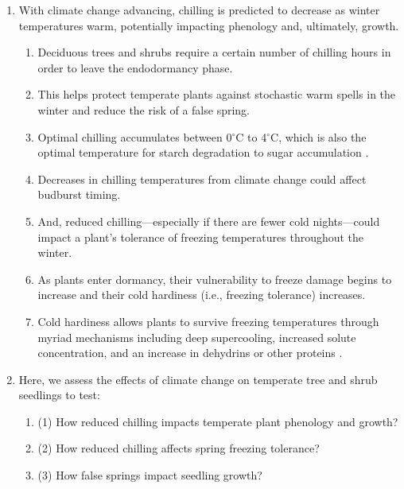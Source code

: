 \documentclass{article}\usepackage[]{graphicx}\usepackage[]{color}
\begin{document}
\begin{enumerate}
\item With climate change advancing, chilling is predicted to decrease as winter temperatures warm, potentially impacting phenology and, ultimately, growth.
  \begin{enumerate}
  \item Deciduous trees and shrubs require a certain number of chilling hours in order to leave the endodormancy phase. 
  \item This helps protect temperate plants against stochastic warm spells in the winter and reduce the risk of a false spring.
  \item Optimal chilling accumulates between 0$^{\circ}$C to 4$^{\circ}$C, which is also the optimal temperature for starch degradation to sugar accumulation \citep{Tixier2019}.
  \item Decreases in chilling temperatures from climate change could affect budburst timing.
  \item And, reduced chilling---especially if there are fewer cold nights---could impact a plant's tolerance of freezing temperatures throughout the winter.
  \item As plants enter dormancy, their vulnerability to freeze damage begins to increase and their cold hardiness (i.e., freezing tolerance) increases. 
  \item Cold hardiness allows plants to survive freezing temperatures through myriad mechanisms including deep supercooling, increased solute concentration, and an increase in dehydrins or other proteins \citep{Sakai1987, Strimbeck2015}.
  \end{enumerate}
  

\item Here, we assess the effects of climate change on temperate tree and shrub seedlings to test:  
  \begin{enumerate}
  \item (1) How reduced chilling impacts temperate plant phenology and growth?
  \item (2) How reduced chilling affects spring freezing tolerance?
  \item (3) How false springs impact seedling growth?
  \end{enumerate}
\end{enumerate}
  
  
\end{document}
